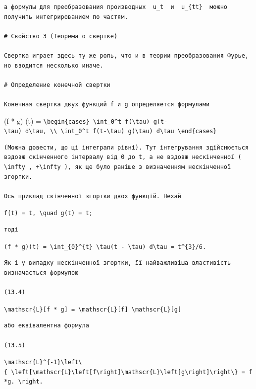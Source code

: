 \documentclass[
  ukrainian,
]{article}
\begin{document}
\begin{verbatim}
а формулы для преобразования производных  u_t  и  u_{tt}  можно получить интегрированием по частям.

# Свойство 3 (Теорема о свертке)

Свертка играет здесь ту же роль, что и в теории преобразования Фурье, но вводится несколько иначе.

# Определение конечной свертки

Конечная свертка двух функций f и g определяется формулами
\end{verbatim}

(f * g) (t) =
\texttt{\textbackslash{}begin\{cases\}\ \textbackslash{}int\_0\^{}t\ f(\textbackslash{}tau)\ g(t-\textbackslash{}tau)\ d\textbackslash{}tau,\ \textbackslash{}\textbackslash{}\ \textbackslash{}int\_0\^{}t\ f(t-\textbackslash{}tau)\ g(\textbackslash{}tau)\ d\textbackslash{}tau\ \textbackslash{}end\{cases\}}

\begin{verbatim}
(Можна довести, що ці інтеграли рівні). Тут інтегрування здійснюється вздовж скінченного інтервалу від 0 до t, а не вздовж нескінченної ( \infty , +\infty ), як це було раніше з визначенням нескінченної згортки.

Ось приклад скінченної згортки двох функцій. Нехай
\end{verbatim}

\texttt{f(t)\ =\ t,\ \textbackslash{}quad\ g(t)\ =\ t;}

\begin{verbatim}
тоді
\end{verbatim}

\texttt{(f\ *\ g)(t)\ =\ \textbackslash{}int\_\{0\}\^{}\{t\}\ \textbackslash{}tau(t\ -\ \textbackslash{}tau)\ d\textbackslash{}tau\ =\ t\^{}\{3\}/6.}

\begin{verbatim}
Як і у випадку нескінченної згортки, її найважливіша властивість визначається формулою

(13.4)
\end{verbatim}

\texttt{\textbackslash{}mathscr\{L\}{[}f\ *\ g{]}\ =\ \textbackslash{}mathscr\{L\}{[}f{]}\ \textbackslash{}mathscr\{L\}{[}g{]}}

\begin{verbatim}
або еквівалентна формула

(13.5)
\end{verbatim}

\texttt{\textbackslash{}mathscr\{L\}\^{}\{-1\}\textbackslash{}left\textbackslash{}\{\ \textbackslash{}left{[}\textbackslash{}mathscr\{L\}\textbackslash{}left{[}f\textbackslash{}right{]}\textbackslash{}mathscr\{L\}\textbackslash{}left{[}g\textbackslash{}right{]}\textbackslash{}right\textbackslash{}\}\ =\ f*g.\ \textbackslash{}right.}
\end{document}
